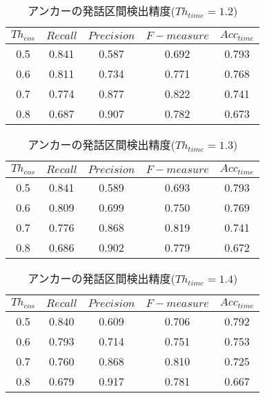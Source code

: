 \begin{table}[H]
  \begin{center}
    \caption{アンカーの発話区間検出精度($Th_{time}=1.2$) \label{table:result_get_anchor12}}
    \begin{tabular}{|c||c|c|c|c|} \hline
      $Th_{cos}$ & $Recall$ & $Precision$ & $F-measure$ & $Acc_{time}$\\ \hline
0.5 & 0.841 & 0.587 & 0.692 & 0.793 \\ \hline
0.6 & 0.811 & 0.734 & 0.771 & 0.768 \\ \hline
0.7 & 0.774 & 0.877 & 0.822 & 0.741 \\ \hline
0.8 & 0.687 & 0.907 & 0.782 & 0.673 \\ \hline

    \end{tabular}
  \end{center}
\end{table}

\begin{table}[H]
  \begin{center}
    \caption{アンカーの発話区間検出精度($Th_{time}=1.3$) \label{table:result_get_anchor13}}
    \begin{tabular}{|c||c|c|c|c|} \hline
      $Th_{cos}$ & $Recall$ & $Precision$ & $F-measure$ & $Acc_{time}$\\ \hline
0.5 & 0.841 & 0.589 & 0.693 & 0.793 \\ \hline
0.6 & 0.809 & 0.699 & 0.750 & 0.769 \\ \hline
0.7 & 0.776 & 0.868 & 0.819 & 0.741 \\ \hline
0.8 & 0.686 & 0.902 & 0.779 & 0.672 \\ \hline

    \end{tabular}
  \end{center}
\end{table}

\begin{table}[H]
  \begin{center}
    \caption{アンカーの発話区間検出精度($Th_{time}=1.4$) \label{table:result_get_anchor14}}
    \begin{tabular}{|c||c|c|c|c|} \hline
      $Th_{cos}$ & $Recall$ & $Precision$ & $F-measure$ & $Acc_{time}$\\ \hline
0.5 & 0.840 & 0.609 & 0.706 & 0.792 \\ \hline
0.6 & 0.793 & 0.714 & 0.751 & 0.753 \\ \hline
0.7 & 0.760 & 0.868 & 0.810 & 0.725 \\ \hline
0.8 & 0.679 & 0.917 & 0.781 & 0.667 \\ \hline

    \end{tabular}
  \end{center}
\end{table}

